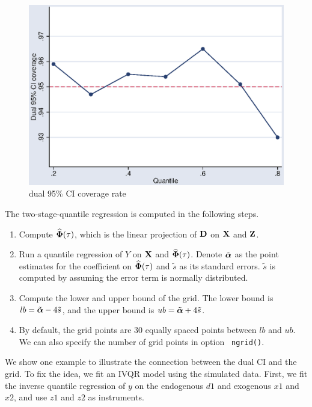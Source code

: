 \begin{figure}[H]
\caption{dual 95\% CI coverage rate}
\label{fig:dualci}
\centering
\includegraphics[scale=0.8]{eps/dualci}
\end{figure}

The two-stage-quantile regression is computed in the following steps.

\begin{enumerate}
  \item Compute $\widehat{\boldsymbol{\Phi}}(\tau)$, which is the linear projection of $\mathbf{D}$ on
  $\mathbf{X}$ and $\mathbf{Z}$.
  \item Run a quantile regression of $Y$ on $\mathbf{X}$ and $\widehat{\boldsymbol{\Phi}}(\tau)$.
  Denote $\tilde{\boldsymbol{\alpha}}$ as the point estimates for the coefficient on
  $\widehat{\boldsymbol{\Phi}}(\tau)$ and $\tilde{s}$ as its standard errors.  $\tilde{s}$ is
  computed by assuming the error term is normally distributed.
  \item Compute the lower and upper bound of the grid. The lower bound is
    $lb = \tilde{\boldsymbol{\alpha}} - 4\tilde{s}$, and the upper bound is 
    $ub = \tilde{\boldsymbol{\alpha}} + 4\tilde{s}$.
  \item By default, the grid points are 30 equally spaced points between $lb$
  and $ub$. We can also specify the number of grid points in option {\tt
  ngrid()}.
\end{enumerate}

We show one example to illustrate the connection between the dual CI
and the grid.  To fix the idea, we fit an IVQR model using the simulated data.
First, we fit the inverse quantile regression of $y$ on the endogenous $d1$ and
exogenous $x1$ and $x2$, and use $z1$ and $z2$ as instruments.

